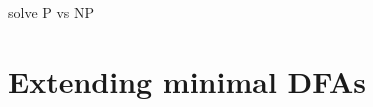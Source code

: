 \documentclass[a4paper, oneside, 11pt]{report}
\theoremstyle{definition}
\theoremstyle{remark}
\begin{document}
solve P vs NP

\chapter{Extending minimal DFAs}

%
%
\end{document}
